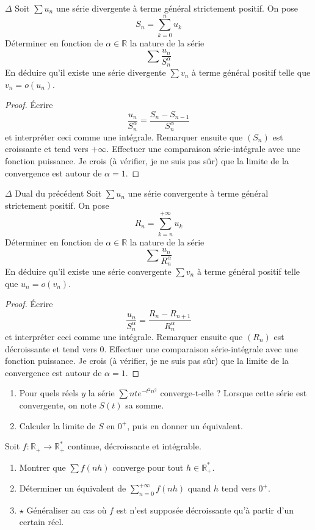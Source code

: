 \documentclass[french,a4paper]{article}
\newcommand{\R}{\mathbb{R}}
\newcommand{\st}{^*}
\theoremstyle{plain}
\theoremstyle{definition}
\theoremstyle{remark}
\begin{document}
\begin{ex}[Moulin.40]{$\Delta$}
	Soit $\sum u_n$ une série divergente à terme général strictement positif. On pose $$S_n=\sum_{k=0}^{n}u_k$$ Déterminer en fonction de $\alpha\in\R$ la nature de la série $$\sum\frac{u_n}{S_n^\alpha}$$ En déduire qu'il existe une série divergente $\sum v_n$ à terme général positif telle que $v_n=o(u_n)$.
\end{ex}
\begin{proof}
	Écrire $$\frac{u_n}{S_n^\alpha}=\frac{S_n-S_{n-1}}{S_n^\alpha}$$ et interpréter ceci comme une intégrale. Remarquer ensuite que $(S_n)$ est croissante et tend vers $+\infty$. Effectuer une comparaison série-intégrale avec une fonction puissance. Je crois (à vérifier, je ne suis pas sûr) que la limite de la convergence est autour de $\alpha=1$.
\end{proof}

\begin{ex}[Moulin.41]{$\Delta$ Dual du précédent}
	Soit $\sum u_n$ une série convergente à terme général strictement positif. On pose $$R_n=\sum_{k=n}^{+\infty}u_k$$ Déterminer en fonction de $\alpha\in\R$ la nature de la série $$\sum\frac{u_n}{R_n^\alpha}$$ En déduire qu'il existe une série convergente $\sum v_n$ à terme général positif telle que $u_n=o(v_n)$.
\end{ex}
\begin{proof}
	Écrire $$\frac{u_n}{S_n^\alpha}=\frac{R_n-R_{n+1}}{R_n^\alpha}$$ et interpréter ceci comme une intégrale. Remarquer ensuite que $(R_n)$ est décroissante et tend vers $0$. Effectuer une comparaison série-intégrale avec une fonction puissance. Je crois (à vérifier, je ne suis pas sûr) que la limite de la convergence est autour de $\alpha=1$.
\end{proof}

\begin{ex}[Moulin.42]{}
	\begin{enumerate}
		\item Pour quels réels $y$ la série $\displaystyle\sum nte^{-t^2n^2}$ converge-t-elle ? Lorsque cette série est convergente, on note $S(t)$ sa somme.
		\item Calculer la limite de $S$ en $0^+$, puis en donner un équivalent.
	\end{enumerate}
\end{ex}

\begin{ex}[Moulin.43]{}
	Soit $f:\R_+\to\R_+\st$ continue, décroissante et intégrable.
	\begin{enumerate}
		\item Montrer que $\displaystyle\sum f(nh)$ converge pour tout $h\in\R_+\st$.
		\item Déterminer un équivalent de $\displaystyle\sum_{n=0}^{+\infty}f(nh)$ quand $h$ tend vers $0^+$.
		\item $\star$ Généraliser au cas où $f$ est n'est supposée décroissante qu'à partir d'un certain réel.
	\end{enumerate}
\end{ex}
\end{document}
